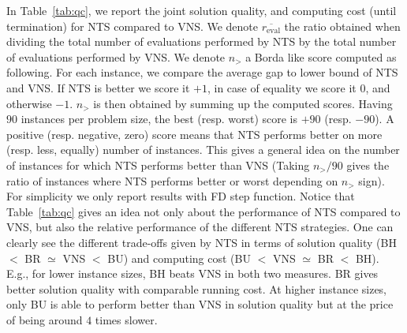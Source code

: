 \documentclass{acm_proc_article-sp}
\begin{document}
In Table~\ref{tab:qc}, we report the joint solution quality, and computing cost (until termination) for NTS compared to VNS. We denote $\overline{r_{\textrm{eval}}}$ the ratio obtained when dividing the total number of evaluations performed by NTS by the total number of evaluations performed by VNS. We denote $n_{>}$ a Borda like score computed as following. For each instance, we compare the average gap to lower bound of NTS and VNS. If NTS is better we score it $+1$, in case of equality we score it $0$, and otherwise $-1$. $n_{>}$ is then obtained by summing up the computed scores. Having $90$ instances per problem size, the best (resp. worst) score is $+90$ (resp. $-90$). A positive (resp. negative, zero) score means that NTS performs better on more (resp. less, equally) number of instances. This gives a general idea on the number of instances for which NTS performs better than VNS (Taking $n_{>}/90$ gives the ratio of instances where NTS performs better or worst depending on $n_{>}$ sign). For simplicity we only report results with FD step function. Notice that Table~\ref{tab:qc} gives an idea not only about the performance of NTS compared to VNS, but also the relative performance of the different NTS strategies. One can clearly see the different trade-offs given by NTS in terms of solution quality (BH $<$ BR $\simeq$ VNS $<$ BU) and computing cost (BU $<$ VNS $\simeq$ BR $<$ BH). E.g., for lower instance sizes, BH beats VNS in both two measures. BR gives better solution quality with comparable running cost. At higher instance sizes, only BU is able to perform better than VNS in solution quality but at the price of being around $4$ times slower.
\end{document}
